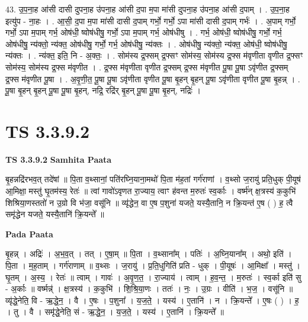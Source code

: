\documentclass[17pt]{extarticle}
\begin{document}
43. उ॒प॒ना॒ह आ॑सी दासी दुपना॒ह उ॑पना॒ह आ॑सी द॒पा म॒पा मा॑सी दुपना॒ह उ॑पना॒ह आ॑सी द॒पाम् । . उ॒प॒ना॒ह इत्यु॑प - ना॒हः । . आ॒सी॒ द॒पा म॒पा मा॑सी दासी द॒पाम् गर्भो॒ गर्भो॒ ऽपा मा॑सी दासी द॒पाम् गर्भः॑ । . अ॒पाम् गर्भो॒ गर्भो॒ ऽपा म॒पाम् गर्भ॒ ओष॑धी॒ ष्वोष॑धीषु॒ गर्भो॒ ऽपा म॒पाम् गर्भ॒ ओष॑धीषु । . गर्भ॒ ओष॑धी॒ ष्वोष॑धीषु॒ गर्भो॒ गर्भ॒ ओष॑धीषु॒ न्य॑क्तो॒ न्य॑क्त॒ ओष॑धीषु॒ गर्भो॒ गर्भ॒ ओष॑धीषु॒ न्य॑क्तः । . ओष॑धीषु॒ न्य॑क्तो॒ न्य॑क्त॒ ओष॑धी॒ ष्वोष॑धीषु॒ न्य॑क्तः । . न्य॑क्त॒ इति॒ नि - अ॒क्तः॒ । . सोम॑स्य द्र॒फ्सम् द्र॒फ्सꣳ सोम॑स्य॒ सोम॑स्य द्र॒फ्स म॑वृणीता वृणीत द्र॒फ्सꣳ सोम॑स्य॒ सोम॑स्य द्र॒फ्स म॑वृणीत । . द्र॒फ्स म॑वृणीता वृणीत द्र॒फ्सम् द्र॒फ्स म॑वृणीत पू॒षा पू॒षा ऽवृ॑णीत द्र॒फ्सम् द्र॒फ्स म॑वृणीत पू॒षा । . अ॒वृ॒णी॒त॒ पू॒षा पू॒षा ऽवृ॑णीता वृणीत पू॒षा बृ॒हन् बृ॒हन् पू॒षा ऽवृ॑णीता वृणीत पू॒षा बृ॒हन्न् । . पू॒षा बृ॒हन् बृ॒हन् पू॒षा पू॒षा बृ॒हन्, नद्रि॒ रद्रि॑र् बृ॒हन् पू॒षा पू॒षा बृ॒हन्, नद्रिः॑ । \newline
\pagebreak
{}

\section{ TS 3.3.9.2 }

\textbf{TS 3.3.9.2 } \newline
\textbf{Samhita Paata} \newline

बृ॒हन्नद्रि॑रभव॒त् तदे॑षां ॥ पि॒ता व॒थ्सानां॒ पति॑रघ्नि॒याना॒मथो॑ पि॒ता म॑ह॒तां गर्ग॑राणां । व॒थ्सो ज॒रायु॑ प्रति॒धुक् पी॒यूष॑ आ॒मिक्षा॒ मस्तु॑ घृ॒तम॑स्य॒ रेतः॑ ॥ त्वां गावो॑ऽवृणत रा॒ज्याय॒ त्वाꣳ ह॑वन्त म॒रुतः॑ स्व॒र्काः । वर्ष्म॑न् क्ष॒त्रस्य॑ क॒कुभि॑ शिश्रिया॒णस्ततो॑ न उ॒ग्रो वि भ॑जा॒ वसू॑नि ॥ व्यृ॑द्धेन॒ वा ए॒ष प॒शुना॑ यजते॒ यस्यै॒तानि॒ न क्रि॒यन्त॑ ए॒ष ( ) ह॒ त्वै समृ॑द्धेन यजते॒ यस्यै॒तानि॑ क्रि॒यन्ते᳚ ॥ \newline

\textbf{Pada Paata} \newline

बृ॒हन्न् । अद्रिः॑ । अ॒भ॒व॒त् । तत् । ए॒षा॒म् ॥ पि॒ता । व॒थ्साना᳚म् । पतिः॑ । अ॒घ्नि॒याना᳚म् । अथो॒ इति॑ । पि॒ता । म॒ह॒ताम् । गर्ग॑राणाम् ॥ व॒थ्सः । ज॒रायु॑ । प्र॒ति॒धुगिति॑ प्रति - धुक् । पी॒यूषः॑ । आ॒मिक्षा᳚ । मस्तु॑ । घृ॒तम् । अ॒स्य॒ । रेतः॑ ॥ त्वाम् । गावः॑ । अ॒वृ॒ण॒त॒ । रा॒ज्याय॑ । त्वाम् । ह॒व॒न्त॒ । म॒रुतः॑ । स्व॒र्का इति॑ सु - अ॒र्काः ॥ वर्ष्मन्न्॑ । क्ष॒त्रस्य॑ । क॒कुभि॑ । शि॒श्रि॒या॒णः । ततः॑ । नः॒ । उ॒ग्रः । वीति॑ । भ॒ज॒ । वसू॑नि ॥ व्यृ॑द्धे॒नेति॒ वि - ऋ॒द्धे॒न॒ । वै । ए॒षः । प॒शुना᳚ । य॒ज॒ते॒ । यस्य॑ । ए॒तानि॑ । न । क्रि॒यन्ते᳚ । ए॒षः ( ) । ह॒ । तु । वै । समृ॑द्धे॒नेति॒ सं - ऋ॒द्धे॒न॒ । य॒ज॒ते॒ । यस्य॑ । ए॒तानि॑ । क्रि॒यन्ते᳚ ॥  \newline
\end{document}
